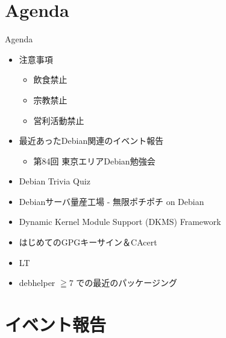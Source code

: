 \section{Agenda}
\begin{frame}{Agenda}
\begin{minipage}[t]{0.45\hsize}
  \begin{itemize}
  \item 注意事項
	\begin{itemize}
	 \item 飲食禁止
	 \item 宗教禁止
	 \item 営利活動禁止
	\end{itemize}
   \item 最近あったDebian関連のイベント報告
	\begin{itemize}
        \item 第84回 東京エリアDebian勉強会
	\end{itemize}
 \end{itemize}
\end{minipage} 
\begin{minipage}[t]{0.45\hsize}
 \begin{itemize}
   \item Debian Trivia Quiz
   \item Debianサーバ量産工場 - 無限ポチポチ on Debian
   \item Dynamic Kernel Module Support (DKMS) Framework
   \item はじめてのGPGキーサイン＆CAcert
   \item LT
   \item debhelper $\geqq 7$ での最近のパッケージング
  \end{itemize}
\end{minipage}
\end{frame}

\section{イベント報告}

